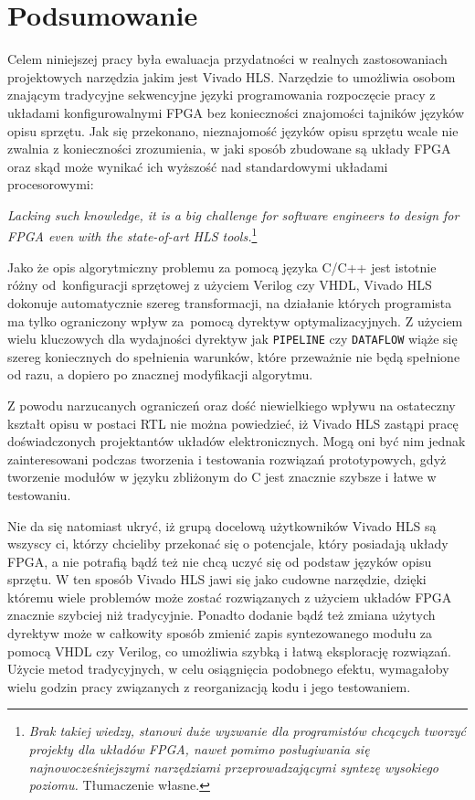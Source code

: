 \chapter*{Podsumowanie}

\pagestyle{empty}
\pagestyle{fancy}
\fancyhead{} %
\fancyhead[RO,LE]{\thepage}

Celem niniejszej pracy była ewaluacja przydatności w realnych zastosowaniach projektowych narzędzia jakim jest Vivado HLS. Narzędzie to umożliwia osobom znającym tradycyjne sekwencyjne języki programowania rozpoczęcie pracy z układami konfigurowalnymi FPGA bez konieczności znajomości tajników języków opisu sprzętu. Jak się przekonano, nieznajomość języków opisu sprzętu wcale nie zwalnia z konieczności zrozumienia, w jaki sposób zbudowane są układy FPGA oraz skąd może wynikać ich wyższość nad standardowymi układami procesorowymi:

\begin{displayquote}
\textit{Lacking such knowledge, it is a big challenge for software engineers to design for FPGA even with the state-of-art HLS tools.}\footnote{\textit{Brak takiej wiedzy, stanowi duże wyzwanie dla programistów chcących tworzyć projekty dla układów FPGA, nawet pomimo posługiwania się najnowocześniejszymi narzędziami przeprowadzającymi syntezę wysokiego poziomu.} Tłumaczenie własne.}\cite{FPGA_SD}
\end{displayquote}

Jako że opis algorytmiczny problemu za pomocą języka C/C++ jest istotnie różny od~konfiguracji sprzętowej z użyciem Verilog czy VHDL, Vivado HLS dokonuje automatycznie szereg transformacji, na działanie których programista ma tylko ograniczony wpływ za~pomocą dyrektyw optymalizacyjnych. Z użyciem wielu kluczowych dla wydajności dyrektyw jak \texttt{PIPELINE} czy \texttt{DATAFLOW} wiąże się szereg koniecznych do spełnienia warunków, które przeważnie nie będą spełnione od razu, a dopiero po znacznej modyfikacji algorytmu. 

Z powodu narzucanych ograniczeń oraz dość niewielkiego wpływu na ostateczny kształt opisu w postaci RTL nie można powiedzieć, iż Vivado HLS zastąpi pracę doświadczonych projektantów układów elektronicznych. Mogą oni być nim jednak zainteresowani podczas tworzenia i testowania rozwiązań prototypowych, gdyż tworzenie modułów w języku zbliżonym do C jest znacznie szybsze i łatwe w testowaniu. 

Nie da się natomiast ukryć, iż grupą docelową użytkowników Vivado HLS są wszyscy ci, którzy chcieliby przekonać się o potencjale, który posiadają układy FPGA, a nie potrafią bądź też nie chcą uczyć się od podstaw języków opisu sprzętu. W ten sposób Vivado HLS jawi się jako cudowne narzędzie, dzięki któremu wiele problemów może zostać rozwiązanych z użyciem układów FPGA znacznie szybciej niż tradycyjnie. Ponadto dodanie bądź też zmiana użytych dyrektyw może w całkowity sposób zmienić zapis syntezowanego modułu za pomocą VHDL czy Verilog, co umożliwia szybką i łatwą eksplorację rozwiązań. Użycie metod tradycyjnych, w celu osiągnięcia podobnego efektu, wymagałoby wielu godzin pracy związanych z reorganizacją kodu i jego testowaniem.

